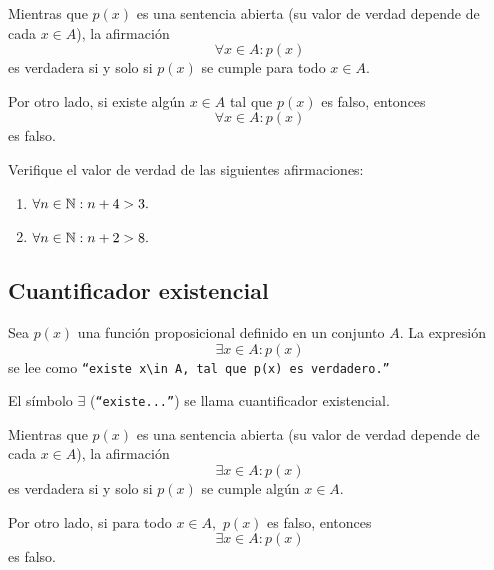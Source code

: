 \documentclass[xcolor={svgnames},
  hyperref={colorlinks}, 
  spanish, 12pt]{beamer}
\numberwithin{equation}{section} %
\numberwithin{figure}{section} %
\begin{document}
\begin{frame}
 Mientras que $p(x)$ es una sentencia abierta (su valor de verdad depende de cada $x\in A$), la afirmaci\'on 
 $$\forall x\in A: p(x)$$ es verdadera si y solo si $p(x)$ se cumple para todo $x\in A.$  
\end{frame}

\begin{frame}
 Por otro lado, si existe alg\'un $x\in A$ tal que $p(x)$ es falso, entonces $$\forall x\in A: p(x)$$ es falso.
\end{frame}

\begin{frame}
 \begin{exmp}
  \label{lip:exmp:4.8}
  Verifique el valor de verdad de las siguientes afirmaciones:
  \begin{enumerate}
   \item $\forall n \in \mathbb{N}: n+4>3.$ \pause
   \item $\forall n \in \mathbb{N}: n+2>8.$
  \end{enumerate}

 \end{exmp}

\end{frame}

\subsection{Cuantificador existencial}

\begin{frame}
 Sea $p(x)$ una funci\'on proposicional definido en un conjunto $A.$ La expresi\'on
 \begin{equation}
 \label{lip:4.3}
   \exists x \in A: p(x)
 \end{equation} 
 se lee como  \texttt{``existe $x\in A,$ tal que $p(x)$ es verdadero.''}  \pause
 
 El s\'imbolo $\exists$ (\texttt{``existe...''}) se llama cuantificador existencial.
\end{frame}


\begin{frame}
 Mientras que $p(x)$ es una sentencia abierta (su valor de verdad depende de cada $x\in A$), la afirmaci\'on 
 $$\exists x\in A: p(x)$$ es verdadera si y solo si $p(x)$ se cumple alg\'un $x\in A.$  
\end{frame}

\begin{frame}
 Por otro lado, si para todo $x\in A,$ $p(x)$ es falso, entonces $$\exists x\in A: p(x)$$ es falso.
\end{frame}
\end{document}

